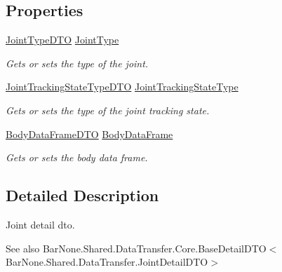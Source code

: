 \subsection*{Properties}
\begin{DoxyCompactItemize}
\item 
\mbox{\hyperlink{class_bar_none_1_1_shared_1_1_data_transfer_1_1_lift_data_1_1_joint_type_d_t_o}{Joint\+Type\+D\+TO}} \mbox{\hyperlink{class_bar_none_1_1_shared_1_1_data_transfer_1_1_joint_detail_d_t_o_a8ce78e4e245cfc63a5d9d2c024896130}{Joint\+Type}}
\begin{DoxyCompactList}\small\item\em Gets or sets the type of the joint. \end{DoxyCompactList}\item 
\mbox{\hyperlink{class_bar_none_1_1_shared_1_1_data_transfer_1_1_lift_data_1_1_joint_tracking_state_type_d_t_o}{Joint\+Tracking\+State\+Type\+D\+TO}} \mbox{\hyperlink{class_bar_none_1_1_shared_1_1_data_transfer_1_1_joint_detail_d_t_o_ad07ef7ae7887510063b8b0cd49b08b59}{Joint\+Tracking\+State\+Type}}
\begin{DoxyCompactList}\small\item\em Gets or sets the type of the joint tracking state. \end{DoxyCompactList}\item 
\mbox{\hyperlink{class_bar_none_1_1_shared_1_1_data_transfer_1_1_body_data_frame_d_t_o}{Body\+Data\+Frame\+D\+TO}} \mbox{\hyperlink{class_bar_none_1_1_shared_1_1_data_transfer_1_1_joint_detail_d_t_o_af01bfe60744f6ed969179894ddef4d5a}{Body\+Data\+Frame}}
\begin{DoxyCompactList}\small\item\em Gets or sets the body data frame. \end{DoxyCompactList}\end{DoxyCompactItemize}


\subsection{Detailed Description}
Joint detail dto. 

\begin{DoxySeeAlso}{See also}
Bar\+None.\+Shared.\+Data\+Transfer.\+Core.\+Base\+Detail\+D\+T\+O$<$\+Bar\+None.\+Shared.\+Data\+Transfer.\+Joint\+Detail\+D\+T\+O$>$


\end{DoxySeeAlso}


